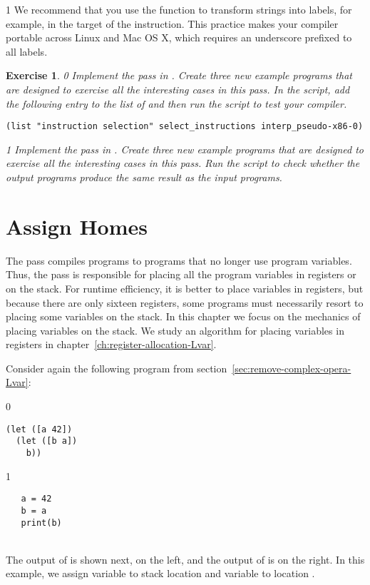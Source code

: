 \documentclass[7x10]{TimesAPriori_MIT}%
\def\racketEd{0}
\def\pythonEd{1}
\def\edition{1}
\newcommand{\pythonColor}[0]{}
\newtheorem{exercise}[theorem]{Exercise}
\numberwithin{theorem}{chapter}
\numberwithin{definition}{chapter}
\numberwithin{equation}{chapter}
\begin{document}
{\if\edition\pythonEd\pythonColor
We recommend that you use the function  to
transform strings into labels, for example, in
the target of the  instruction. This practice makes your
compiler portable across Linux and Mac OS X, which requires an underscore
prefixed to all labels.
\fi}
\begin{exercise}
  \normalfont\normalsize
{\if\edition\racketEd
Implement the  pass in
. Create three new example programs that are
designed to exercise all the interesting cases in this pass.
%
In the  script, add the following entry to the
list of  and then run the script to test your compiler.
\begin{lstlisting}
(list "instruction selection" select_instructions interp_pseudo-x86-0)
\end{lstlisting}
\fi}
{\if\edition\pythonEd\pythonColor
Implement the  pass in
. Create three new example programs that are
designed to exercise all the interesting cases in this pass.
Run the  script to check
whether the output programs produce the same result as the input
programs.
\fi}
\end{exercise}


\section{Assign Homes}
\label{sec:assign-Lvar}

The  pass compiles \LangXVar{} programs to
\LangXVar{} programs that no longer use program variables.  Thus, the
 pass is responsible for placing all the program
variables in registers or on the stack. For runtime efficiency, it is
better to place variables in registers, but because there are only
sixteen registers, some programs must necessarily resort to placing
some variables on the stack. In this chapter we focus on the mechanics
of placing variables on the stack. We study an algorithm for placing
variables in registers in chapter~\ref{ch:register-allocation-Lvar}.

Consider again the following \LangVar{} program from
section~\ref{sec:remove-complex-opera-Lvar}:\\
\begin{minipage}{0.96\textwidth}
{\if\edition\racketEd
\begin{lstlisting}
(let ([a 42])
  (let ([b a])
    b))
\end{lstlisting}
\fi}
{\if\edition\pythonEd\pythonColor
\begin{lstlisting}
   a = 42
   b = a
   print(b)
\end{lstlisting}
\fi}
\end{minipage}\\
%
The output of  is shown next, on the left,
and the output of  is on the right.
In this example, we assign variable  to stack location
   and variable  to location .
\end{document}
